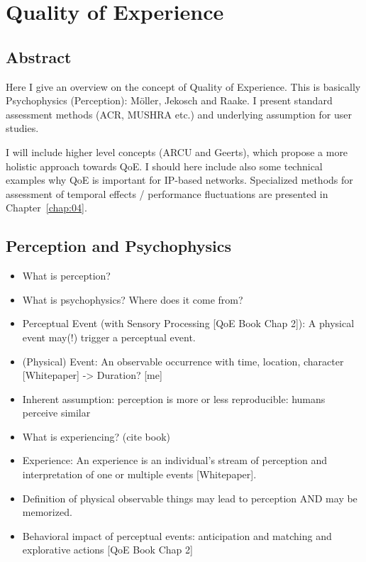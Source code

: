 \chapter{Quality of Experience}
\section*{Abstract}
Here I give an overview on the concept of Quality of Experience.
This is basically Psychophysics (Perception): Möller, Jekosch and Raake.
I present standard assessment methods (ACR, MUSHRA etc.) and underlying assumption for user studies. %

I will include higher level concepts (ARCU and Geerts), which propose a more holistic approach towards QoE.
I should here include also some technical examples why QoE is important for IP-based networks.
Specialized methods for assessment of temporal effects / performance fluctuations are presented in Chapter~\ref{chap:04}.

\section{Perception and Psychophysics}
\begin{itemize}
\item What is perception?
\item What is psychophysics? Where does it come from?
\item Perceptual Event (with Sensory Processing [QoE Book Chap 2]): A physical event may(!) trigger a perceptual event.
\item (Physical) Event: An observable occurrence with time, location, character [Whitepaper] -> Duration? [me]
\item Inherent assumption: perception is more or less reproducible: humans perceive similar

\item What is experiencing? (cite book)
\item Experience: An experience is an individual's stream of perception and interpretation of one or multiple events [Whitepaper].
\item Definition of physical observable things may lead to perception AND may be memorized.
\item Behavioral impact of perceptual events: anticipation and matching and explorative actions [QoE Book Chap 2]
\end{itemize}

